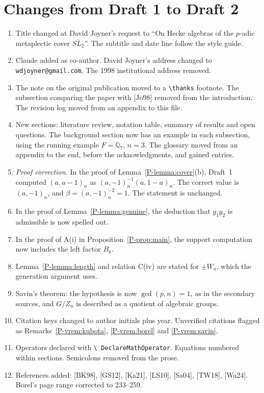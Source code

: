 \documentclass[12pt,letterpaper]{amsart}
\begin{document}
\section{Changes from Draft 1 to Draft 2}
\label{sec:d1d2}

\begin{enumerate}[leftmargin=1.5em]
\item Title changed at David Joyner's request to ``On Hecke algebras of
the $p$-adic metaplectic cover $\overline{SL_2}$''. The subtitle and
date line follow the style guide.
\item Claude added as co-author. David Joyner's address changed to
\texttt{wdjoyner@gmail.com}. The 1998 institutional address removed.
\item The note on the original publication moved to a
\texttt{\textbackslash thanks} footnote. The subsection comparing the
paper with [Jo98] removed from the introduction. The revision log moved
from an appendix to this file.
\item New sections: literature review, notation table, summary of
results and open questions. The background section now has an example
in each subsection, using the running example $F=\mathbb{Q}_7$, $n=3$.
The glossary moved from an appendix to the end, before the
acknowledgments, and gained entries.
\item\label{it:coverb} \emph{Proof correction.} In the proof of
Lemma~\ref{P-lemma:cover}(b), Draft~1 computed $(a,a-1)_n$ as
$(a,-1)_n^{-1}(a,1-a)_n$. The correct value is $(a,-1)_n$, and
$\beta=(a,-1)_n^{-2}=1$. The statement is unchanged.
\item In the proof of Lemma~\ref{P-lemma:genuine}, the deduction that
$g_1g_2$ is admissible is now spelled out.
\item In the proof of A(i) in Proposition~\ref{P-prop:main}, the
support computation now includes the left factor $B_k$.
\item Lemma~\ref{P-lemma:length} and relation C(iv) are stated for
$\pm W_a$, which the generation argument uses.
\item Savin's theorem: the hypothesis is now $\gcd(p,n)=1$, as in the
secondary sources, and $G/Z_n$ is described as a quotient of algebraic
groups.
\item Citation keys changed to author initials plus year. Unverified
citations flagged as Remarks~\ref{P-vrem:kubota},
\ref{P-vrem:borel} and \ref{P-vrem:savin}.
\item Operators declared with \texttt{\textbackslash
DeclareMathOperator}. Equations numbered within sections. Semicolons
removed from the prose.
\item References added: [BK98], [GS12], [Ka21], [LS10], [Sa04],
[TW18], [Wa24]. Borel's page range corrected to 233--259.
\end{enumerate}
\end{document}

